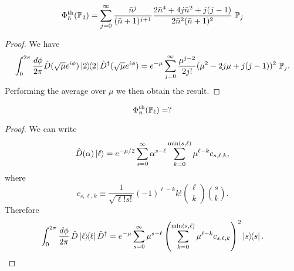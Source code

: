 \documentclass[12pt]{report}
\newcommand{\PP}{\mathbb{P}}
\begin{document}
\begin{prop}
	\begin{equation}
		\Phi_{\bar n}^{\rm th}(\PP_2)
		= \sum_{j=0}^\infty
		\frac{\bar n^j}{(\bar n + 1)^{j+1}}
		\frac{
			2\bar n^4 + 4j \bar n^2 + j(j-1)
		}{2 \bar n^2 (\bar n + 1)^2}
		\,\, \PP_j
	\end{equation}
\end{prop}
\begin{proof}
	We have
	\begin{equation}
		\int_0^{2\pi} \frac{d\phi}{2\pi}
		\hat D(\sqrt\mu e^{i\phi})\ketbra2 \hat D^\dagger(\sqrt\mu e^{i\phi})
		= e^{-\mu}
		\sum_{j=0}^\infty \frac{\mu^{j-2}}{2j!}
		(\mu^2 -2j \mu + j(j-1))^2
		\,\,\PP_j.
	\end{equation}
	Performing the average over $\mu$ we then obtain the result.
\end{proof}

\begin{prop}
	\begin{equation}
		\Phi_{\bar n}^{\rm th}(\PP_\ell) = ?
	\end{equation}
\end{prop}
\begin{proof}
	We can write
	\begin{equation}
		\hat D(\alpha) \ket\ell = e^{-\mu/2}
		\sum_{s=0}^\infty \alpha^{s-\ell}
		\sum_{k=0}^{\min(s,\ell)} \mu^{\ell-k} c_{s,\ell,k},
	\end{equation}
	where
	\begin{equation}
		c_{s,\ell,k} \equiv
		\frac{1}{\sqrt{\ell! s!}} (-1)^{\ell-k}
		k! \binom{\ell}{k} \binom{s}{k}.
	\end{equation}
	Therefore
	\begin{equation}
	\begin{gathered}
		\int_0^{2\pi}\frac{d\phi}{2\pi} \,
		\hat D\ketbra{\ell}{\ell} \hat D^\dagger =
		e^{-\mu} \sum_{s=0}^\infty \mu^{s-\ell}
		\left(
			\sum_{k=0}^{\min(s,\ell)} \mu^{\ell-k} c_{s,\ell,k}
		\right)^2
		\ketbra{s}{s}.
	\end{gathered}
	\end{equation}
\end{proof}
\end{document}
